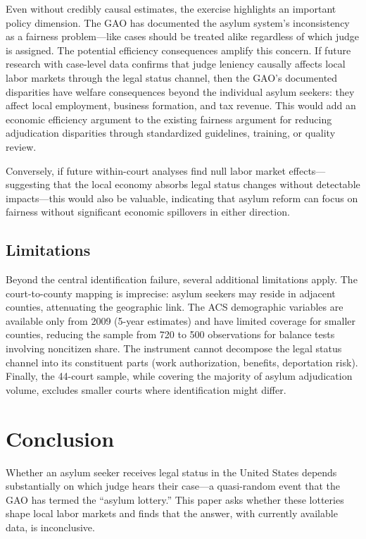 \documentclass[12pt]{article}
\begin{document}
Even without credibly causal estimates, the exercise highlights an important policy dimension. The GAO has documented the asylum system's inconsistency as a fairness problem---like cases should be treated alike regardless of which judge is assigned. The potential efficiency consequences amplify this concern. If future research with case-level data confirms that judge leniency causally affects local labor markets through the legal status channel, then the GAO's documented disparities have welfare consequences beyond the individual asylum seekers: they affect local employment, business formation, and tax revenue. This would add an economic efficiency argument to the existing fairness argument for reducing adjudication disparities through standardized guidelines, training, or quality review.

Conversely, if future within-court analyses find null labor market effects---suggesting that the local economy absorbs legal status changes without detectable impacts---this would also be valuable, indicating that asylum reform can focus on fairness without significant economic spillovers in either direction.

\subsection{Limitations}

Beyond the central identification failure, several additional limitations apply. The court-to-county mapping is imprecise: asylum seekers may reside in adjacent counties, attenuating the geographic link. The ACS demographic variables are available only from 2009 (5-year estimates) and have limited coverage for smaller counties, reducing the sample from 720 to 500 observations for balance tests involving noncitizen share. The instrument cannot decompose the legal status channel into its constituent parts (work authorization, benefits, deportation risk). Finally, the 44-court sample, while covering the majority of asylum adjudication volume, excludes smaller courts where identification might differ.


\section{Conclusion}

Whether an asylum seeker receives legal status in the United States depends substantially on which judge hears their case---a quasi-random event that the GAO has termed the ``asylum lottery.'' This paper asks whether these lotteries shape local labor markets and finds that the answer, with currently available data, is inconclusive.
\end{document}
